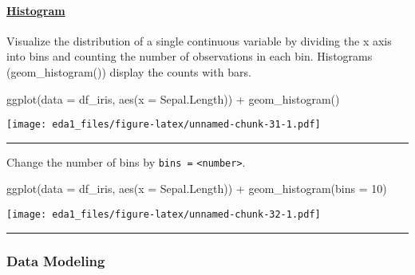 \documentclass[
]{article}
\newenvironment{Shaded}{\begin{snugshade}}{\end{snugshade}}
\newcommand{\AttributeTok}[1]{\textcolor[rgb]{0.77,0.63,0.00}{#1}}
\newcommand{\DecValTok}[1]{\textcolor[rgb]{0.00,0.00,0.81}{#1}}
\newcommand{\FunctionTok}[1]{\textcolor[rgb]{0.00,0.00,0.00}{#1}}
\newcommand{\NormalTok}[1]{#1}
\newcommand{\SpecialCharTok}[1]{\textcolor[rgb]{0.00,0.00,0.00}{#1}}
\begin{document}
\hypertarget{histogram}{%
\paragraph{\texorpdfstring{\href{https://ggplot2.tidyverse.org/reference/geom_histogram.html}{Histogram}}{Histogram}}\label{histogram}}

Visualize the distribution of a single continuous variable by dividing
the x axis into bins and counting the number of observations in each
bin. Histograms (geom\_histogram()) display the counts with bars.

\begin{Shaded}
\begin{Highlighting}[]
\FunctionTok{ggplot}\NormalTok{(}\AttributeTok{data =}\NormalTok{ df\_iris, }\FunctionTok{aes}\NormalTok{(}\AttributeTok{x =}\NormalTok{ Sepal.Length)) }\SpecialCharTok{+}
  \FunctionTok{geom\_histogram}\NormalTok{()}
\end{Highlighting}
\end{Shaded}

\texttt{[image: eda1\_files/figure-latex/unnamed-chunk-31-1.pdf]}

\begin{center}\rule{0.5\linewidth}{0.5pt}\end{center}

Change the number of bins by \texttt{bins\ =}
\texttt{\textless{}number\textgreater{}}.

\begin{Shaded}
\begin{Highlighting}[]
\FunctionTok{ggplot}\NormalTok{(}\AttributeTok{data =}\NormalTok{ df\_iris, }\FunctionTok{aes}\NormalTok{(}\AttributeTok{x =}\NormalTok{ Sepal.Length)) }\SpecialCharTok{+}
  \FunctionTok{geom\_histogram}\NormalTok{(}\AttributeTok{bins =} \DecValTok{10}\NormalTok{)}
\end{Highlighting}
\end{Shaded}

\texttt{[image: eda1\_files/figure-latex/unnamed-chunk-32-1.pdf]}

\begin{center}\rule{0.5\linewidth}{0.5pt}\end{center}

\hypertarget{data-modeling}{%
\subsubsection{Data Modeling}\label{data-modeling}}
\end{document}

